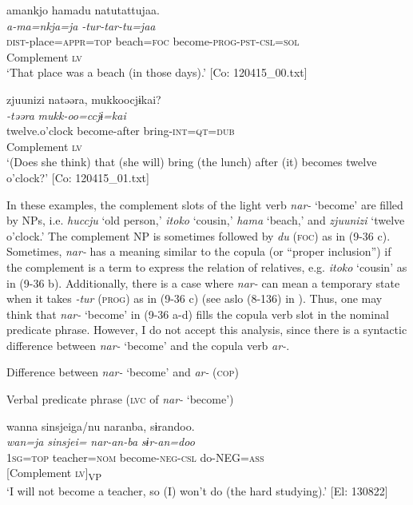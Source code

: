 \ex \label{ex:9.36c} %
    \gllll  amankjo  hamadu  natutattujaa.\\
      \textit{a-ma=nkja=ja}  \textit{}  \textit{-tur-tar-tu=jaa}\\
      \textsc{dist}-place=\textsc{appr}=\textsc{top}  beach=\textsc{foc}  become-\textsc{prog}-\textsc{pst}-\textsc{csl}=\textsc{sol}\\
       {} Complement  \textsc{lv}\\
      \glt       ‘That place was a beach (in those days).’ [Co: 120415\_00.txt]

\ex \label{ex:9.36d} %
    \gllll  {\textbar}zjuunizi{\textbar}  natəəra,  mukkoocjɨkai?\\
      \textit{}  \textit{-təəra}  \textit{mukk-oo=ccjɨ=kai}\\
      twelve.o’clock  become-after  bring-\textsc{int}=\textsc{qt}=\textsc{dub}\\
      Complement  \textsc{lv}  \\
      \glt       ‘(Does she think) that (she will) bring (the lunch) after (it) becomes twelve o’clock?’ [Co: 120415\_01.txt]
    \z
\z

In these examples, the complement slots of the light verb \textit{nar-} ‘become’ are filled by NPs, i.e. \textit{huccju} ‘old person,’ \textit{itoko} ‘cousin,’ \textit{hama} ‘beach,’ and \textit{zjuunizi} ‘twelve o’clock.’ The complement NP is sometimes followed by \textit{du} (\textsc{foc}) as in (9-36 c). Sometimes, \textit{nar-} has a meaning similar to the copula (or “proper inclusion”) \citep[114]{Payne1997} if the complement is a term to express the relation of relatives, e.g. \textit{itoko} ‘cousin’ as in (9-36 b). Additionally, there is a case where \textit{nar-} can mean a temporary state when it takes \textit{{}-tur} (\textsc{prog}) as in (9-36 c) (see aslo (8-136) in ). Thus, one may think that \textit{nar-} ‘become’ in (9-36 a-d) fills the copula verb slot in the nominal predicate phrase. However, I do not accept this analysis, since there is a syntactic difference between \textit{nar-} ‘become’ and the copula verb \textit{ar-}.

\ea   Difference between \textit{nar-} ‘become’ and \textit{ar-} (\textsc{cop}) \label{ex:9.37}

 \exi{} Verbal predicate phrase (\textsc{lvc} of \textit{nar-} ‘become’)

\ea %
 \gllll  *wanna  sinsjeiga/nu  naranba,  sɨrandoo.\\
       \textit{wan=ja}  \textit{sinsjei=}  \textit{nar-an-ba}  \textit{sɨr-an=doo}\\
       1\textsc{sg}=\textsc{top}  teacher=\textsc{nom}  become-\textsc{neg}-\textsc{csl}  do-NEG=\textsc{ass}\\
       {} {[Complement}  {\textsc{lv}]\textsubscript{VP}}  \\
       ‘I will not become a teacher, so (I) won’t do (the hard studying).’ [El: 130822]

